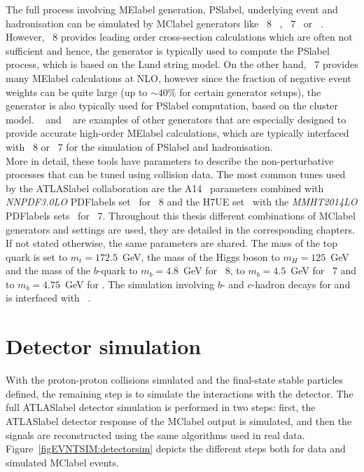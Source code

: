 The full process involving \acrshort{MElabel} generation, \acrshort{PSlabel}, underlying event and hadronisation can be simulated by \acrshort{MClabel} generators like \PYTHIA~8~\cite{SJOSTRAND2015159}
, \HERWIG~7~\cite{Bahr2008,Bellm2016}
or \SHERPA~\cite{10.21468SciPostPhys.7.3.034}. However, \PYTHIA~8 provides leading order cross-section calculations which are often not sufficient and hence, the generator is typically used to compute the \acrshort{PSlabel} process, which is based on the Lund string model. On the other hand, \HERWIG~7 provides many \acrshort{MElabel} calculations at NLO, however since the fraction of negative event weights can be quite large (up to $\sim40\%$ for certain generator setups), the generator is also typically used for \acrshort{PSlabel} computation, based on the cluster model. \POWHEGBOX~\cite{Nason_2004,Frixione_2007,Alioli2010,PhysRevD.91.094003,Frixione_20072}
and \MGMCatNLO~\cite{Alwall_2007}
are examples of other generators that are especially designed to provide accurate high-order \acrshort{MElabel} calculations, which are typically interfaced with \PYTHIA~8 or \HERWIG~7 for the simulation of \acrshort{PSlabel} and hadronisation.\\

More in detail, these tools have parameters to describe the non-perturbative processes that can be tuned using collision data. The most common tunes used by the \acrshort{ATLASlabel} collaboration are the A14~\cite{ATL-PHYS-PUB-2014-021} parameters combined with \textit{NNPDF3.0LO} \acrshort{PDFlabel}s set~\cite{BALL2013244} for \PYTHIA~8 and the H7UE set~\cite{Bellm2016} with the \textit{MMHT2014LO} \acrshort{PDFlabel}s sets~\cite{Harland-Lang2015} for \HERWIG~7. Throughout this thesis different combinations of \acrshort{MClabel} generators and settings are used, they are detailed in the corresponding chapters. If not stated otherwise, the same parameters are shared. The mass of the top quark is set to $m_t=172.5$~GeV, the mass of the Higgs boson to $m_H=125$~GeV and the mass of the $b$-quark to $m_b=4.8$~GeV for \PYTHIA~8, to $m_b=4.5$~GeV for \HERWIG~7 and to $m_b=4.75$~GeV for \SHERPA. The simulation involving $b$- and $c$-hadron decays for \PYTHIA and \HERWIG is interfaced with \EVTGEN~\cite{LANGE2001152}. 

\section{Detector simulation}

With the proton-proton collisions simulated and the final-state stable particles defined, the remaining step is to simulate the interactions with the detector. The full \acrshort{ATLASlabel} detector simulation is performed in two steps: first, the \acrshort{ATLASlabel} detector response of the \acrshort{MClabel} output is simulated, and then the signals are reconstructed using the same algorithms used in real data. Figure~\ref{figEVNTSIM:detectorsim} depicts the different steps both for data and simulated \acrshort{MClabel} events.\\

